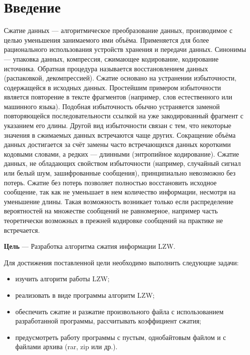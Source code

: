 \chapter*{Введение}

Сжатие данных --- алгоритмическое преобразование данных, производимое с целью уменьшения занимаемого ими объёма. Применяется для более рационального использования устройств хранения и передачи данных. Синонимы — упаковка данных, компрессия, сжимающее кодирование, кодирование источника. Обратная процедура называется восстановлением данных (распаковкой, декомпрессией). Сжатие основано на устранении избыточности, содержащейся в исходных данных. Простейшим примером избыточности является повторение в тексте фрагментов (например, слов естественного или машинного языка). Подобная избыточность обычно устраняется заменой повторяющейся последовательности ссылкой на уже закодированный фрагмент с указанием его длины. Другой вид избыточности связан с тем, что некоторые значения в сжимаемых данных встречаются чаще других. Сокращение объёма данных достигается за счёт замены часто встречающихся данных короткими кодовыми словами, а редких — длинными (энтропийное кодирование). Сжатие данных, не обладающих свойством избыточности (например, случайный сигнал или белый шум, зашифрованные сообщения), принципиально невозможно без потерь. Сжатие без потерь позволяет полностью восстановить исходное сообщение, так как не уменьшает в нем количество информации, несмотря на уменьшение длины. Такая возможность возникает только если распределение вероятностей на множестве сообщений не равномерное, например часть теоретически возможных в прежней кодировке сообщений на практике не встречается.

\textbf{Цель} --- Разработка алгоритма сжатия информации LZW.

Для достижения поставленной цели необходимо выполнить следующие задачи:
\begin{itemize}[label=---]
    \item изучить алгоритм работы LZW;
    \item реализовать в виде программы алгоритм LZW;
    \item обеспечить сжатие и разжатие произвольного файла с использованием разработанной программы, рассчитывать коэффициент сжатия;
    \item предусмотреть работу программы с пустым, однобайтовым файлом и с файлами архива (rar, zip или др.).
\end{itemize}
